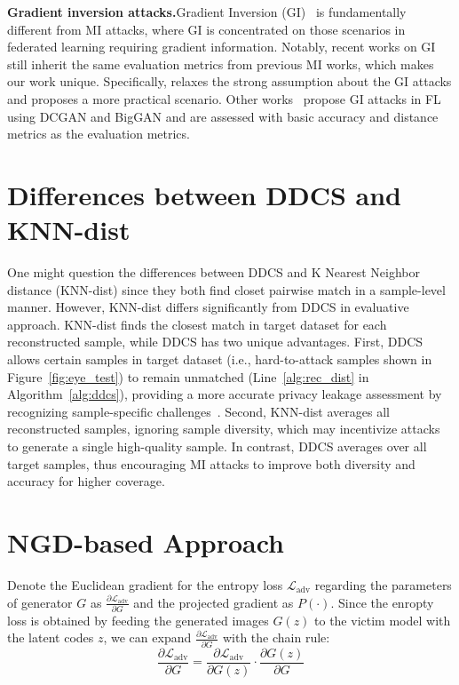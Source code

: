 \noindent
\textbf{Gradient inversion attacks.}\quad Gradient Inversion (GI)~\cite{wr1} is fundamentally different from MI attacks, where GI is concentrated on those scenarios in federated learning requiring gradient information. Notably, recent works on GI~\cite{wr2, wr3, wr4, wr6} still inherit the same evaluation metrics from previous MI works, which makes our work unique. Specifically, \cite{wr1} relaxes the strong assumption about the GI attacks and proposes a more practical scenario. Other works~\cite{wr2, wr3, wr4, wr6} propose GI attacks in FL using DCGAN and BigGAN and are assessed with basic accuracy and distance metrics as the evaluation metrics.

\section{Differences between DDCS and KNN-dist}
One might question the differences between DDCS and K Nearest Neighbor distance (KNN-dist) since they both find closet pairwise match in a sample-level manner.
However, KNN-dist differs significantly from DDCS in evaluative approach. KNN-dist finds the closest match in target dataset for each reconstructed sample, while DDCS has two unique advantages. First, DDCS allows certain samples in target dataset (i.e., hard-to-attack samples shown in Figure~\ref{fig:eye_test}) to remain unmatched (Line~\ref{alg:rec_dist} in Algorithm~\ref{alg:ddcs}), providing a more accurate privacy leakage assessment by recognizing sample-specific challenges~\cite{mif22sp}. Second, KNN-dist averages all reconstructed samples, ignoring sample diversity, which may incentivize attacks to generate a single high-quality sample. In contrast, DDCS averages over all target samples, thus encouraging MI attacks to improve both diversity and accuracy for higher coverage. 

\section{NGD-based Approach}
Denote the Euclidean gradient for the entropy loss $\mathcal{L}_{\text{adv}}$ regarding the parameters of generator $G$ as $\frac{\partial \mathcal{L}_{\text{adv}}}{\partial G}$ and the projected gradient as $P(\cdot)$.
Since the enropty loss is obtained by feeding the generated images $G(z)$ to the victim model with the latent codes $z$, we can expand $\frac{\partial \mathcal{L}_{\text{adv}}}{\partial G}$ with the chain rule:
\begin{equation}
	\frac{\partial \mathcal{L}_{\text{adv}}}{\partial G} = \frac{\partial \mathcal{L}_{\text{adv}}}{\partial G(z)} \cdot
	\frac{\partial G(z)}{\partial G}
	\label{eq:chain_rule}
\end{equation}

